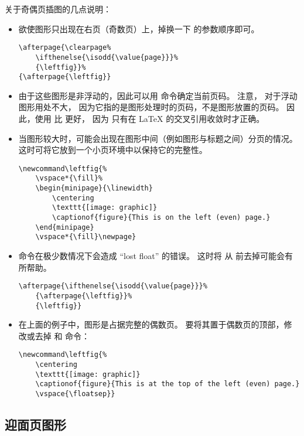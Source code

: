 关于奇偶页插图的几点说明：
\begin{itemize}
	\item 欲使图形只出现在右页（奇数页）上，掉换一下  的参数顺序即可。
\begin{lstlisting}
\afterpage{\clearpage% 
	\ifthenelse{\isodd{\value{page}}}% 
	{\leftfig}}%
{\afterpage{\leftfig}}
\end{lstlisting}
	\item 由于这些图形是非浮动的，因此可以用  命令确定当前页码。
	注意， 对于浮动图形用处不大，
	因为它指的是图形处理时的页码，不是图形放置的页码。
	因此，使用  比  更好，
	因为  只有在 \LaTeX{} 的交叉引用收敛时才正确。
	
	\item 当图形较大时，可能会出现在图形中间（例如图形与标题之间）分页的情况。
	这时可将它放到一个小页环境中以保持它的完整性。
\begin{lstlisting}
\newcommand\leftfig{%
	\vspace*{\fill}%
	\begin{minipage}{\linewidth}
		\centering
		\texttt{[image: graphic]}
		\captionof{figure}{This is on the left (even) page.}
	\end{minipage}
	\vspace*{\fill}\newpage}
\end{lstlisting}

	\item {} 命令在极少数情况下会造成 ``lost float'' 的错误。
	这时将  从  前去掉可能会有所帮助。
\begin{lstlisting}
\afterpage{\ifthenelse{\isodd{\value{page}}}%
	{\afterpage{\leftfig}}%
	{\leftfig}}
\end{lstlisting}
	
	\item 在上面的例子中，图形是占据完整的偶数页。
	要将其置于偶数页的顶部，修改或去掉  和  命令：
\begin{lstlisting}
\newcommand\leftfig{%
	\centering
	\texttt{[image: graphic]}
	\captionof{figure}{This is at the top of the left (even) page.}
	\vspace{\floatsep}}
\end{lstlisting}

\end{itemize}

\subsection{迎面页图形}\label{ssec:fig-facingpage}

